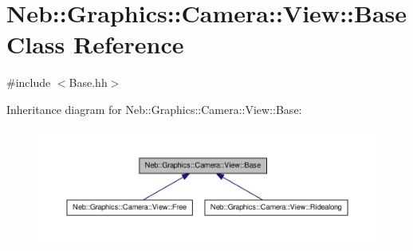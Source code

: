 \hypertarget{classNeb_1_1Graphics_1_1Camera_1_1View_1_1Base}{\section{\-Neb\-:\-:\-Graphics\-:\-:\-Camera\-:\-:\-View\-:\-:\-Base \-Class \-Reference}
\label{classNeb_1_1Graphics_1_1Camera_1_1View_1_1Base}
}


 




{\ttfamily \#include $<$\-Base.\-hh$>$}



\-Inheritance diagram for \-Neb\-:\-:\-Graphics\-:\-:\-Camera\-:\-:\-View\-:\-:\-Base\-:\nopagebreak
\begin{figure}[H]
\begin{center}
\leavevmode
\includegraphics[width=350pt]{classNeb_1_1Graphics_1_1Camera_1_1View_1_1Base__inherit__graph}
\end{center}
\end{figure}
